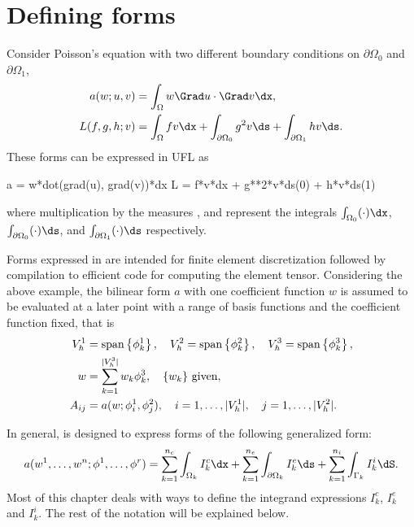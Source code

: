 \section{Defining forms}
\label{ufl:sec:forms}

Consider Poisson's equation with two different boundary
conditions on $\partial\Omega_0$ and $\partial\Omega_1$,
\begin{align}
a(w; u, v) &= \int_\Omega w \Grad u \cdot \Grad v \dx, \\
L(f, g, h; v) &= \int_\Omega f v \dx + \int_{\partial\Omega_0} g^2 v \ds + \int_{\partial\Omega_1} h v \ds.
\end{align}
These forms can be expressed in UFL as
\begin{uflcode}
a = w*dot(grad(u), grad(v))*dx
L = f*v*dx + g**2*v*ds(0) + h*v*ds(1)
\end{uflcode}
where multiplication by the measures ,  and 
represent the integrals $\int_{\Omega_0} (\cdot) \dx$,\break
$\int_{\partial\Omega_0} (\cdot) \ds$,
and $\int_{\partial\Omega_1} (\cdot) \ds$
respectively.

Forms expressed in \ufl{} are intended for finite element
discretization followed by compilation to efficient code for computing
the element tensor.  Considering the above example, the bilinear form
$a$ with one coefficient function $w$ is assumed to be evaluated at a
later point with a range of basis functions and the coefficient
function fixed, that is
\begin{align}
V_h^1 &= \operatorname{span}\left\{ \phi_k^1 \right\}, \quad V_h^2 = \operatorname{span}\left\{ \phi_k^2 \right\}, \quad V_h^3 = \operatorname{span}\left\{ \phi_k^3 \right\}, \\
w &= \sum_{k=1}^{|V^3_h|} w_k \phi_k^3, \quad \{ w_k \} \mbox{ given}, \\
A_{ij} &= a(w; \phi_i^1, \phi_j^2),
    \quad i = 1,\ldots,|V^1_h|, \quad j = 1,\ldots,|V^2_h| . \label{ufl:eq:Aij}
\end{align}

In general, \ufl{} is designed to express forms of the following generalized form:
\begin{align} \label{ufl:eq:form_integrals}
    a(w^1, \ldots, w^n; \phi^1, \ldots, \phi^r) =
           \sum_{k=1}^{n_c} \int_{\Omega_k}          I^c_k \dx
         + \sum_{k=1}^{n_e} \int_{\partial\Omega_k}  I^e_k \ds
         + \sum_{k=1}^{n_i} \int_{\Gamma_k}          I^i_k \dS.
\end{align}
Most of this chapter deals with ways to define the integrand
expressions $I^c_k$, $I^e_k$ and $I^i_k$.  The rest of the notation
will be explained below.

